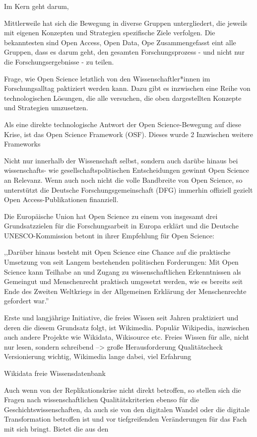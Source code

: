 Im Kern geht darum, 

Mittlerweile hat sich die Bewegung in diverse Gruppen untergliedert, die jeweils mit eigenen Konzepten und Strategien spezifische Ziele verfolgen. Die bekanntesten sind Open Access, Open Data, Ope Zusammengefasst eint alle Gruppen, dass es darum geht, den gesamten Forschungsprozess - und nicht nur die Forschungsergebnisse - zu teilen. 

Frage, wie Open Science letztlich von den Wissenschaftler*innen im Forschungsalltag paktiziert werden kann. Dazu gibt es inzwischen eine Reihe von technologischen Lösungen, die alle versuchen, die oben dargestellten Konzepte und Strategien umzusetzen.

Als eine direkte technologische Antwort der Open Science-Bewegung auf diese Krise, ist das Open Science Framework (OSF). Dieses wurde 2 Inzwischen weitere Frameworks  

Nicht nur innerhalb der Wissenschaft selbst, sondern auch darübe hinaus bei wissenschafts- wie gesellschaftspolitischen Entscheidungen gewinnt Open Science an Relevanz. Wenn auch noch nicht die volle Bandbreite von Open Science, so unterstützt die Deutsche Forschungsgemeinschaft (DFG) immerhin offiziell gezielt Open Access-Publikationen finanziell. 

Die Europäische Union hat Open Science zu einem von insgesamt drei Grundsatzzielen für die Forschungsarbeit in Europa erklärt  und die  Deutsche UNESCO-Kommission betont in ihrer Empfehlung für Open Science:

,,Darüber hinaus besteht mit Open Science eine Chance auf die praktische Umsetzung von seit Langem bestehenden politischen Forderungen: Mit Open Science kann Teilhabe an und Zugang zu wissenschaftlichen Erkenntnissen als Gemeingut und Menschenrecht praktisch umgesetzt werden, wie es bereits seit Ende des Zweiten Weltkriegs in der Allgemeinen Erklärung der Menschenrechte gefordert war.''

Erste und langjährige Initiative, die freies Wissen seit Jahren praktiziert und deren die diesem Grundsatz folgt, ist Wikimedia. Populär Wikipedia, inzwischen auch andere Projekte wie Wikidata, Wikisource etc. Freies Wissen für alle, nicht nur lesen, sondern schreibend --> große Herausforderung Qualitätscheck Versionierung wichtig, Wikimedia lange dabei, viel Erfahrung

Wikidata freie Wissensdatenbank

Auch wenn von der Replikationskrise nicht direkt betroffen, so stellen sich die Fragen nach wissenschaftlichen Qualitätskriterien ebenso für die Geschichtswissenschaften, da auch sie von  den digitalen Wandel oder die digitale Transformation betroffen ist und vor tiefgreifenden Veränderungen für das Fach mit sich bringt. 
Bietet die aus den 





